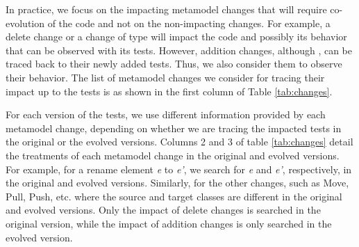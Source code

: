 
\blue{}In practice, we focus on the impacting metamodel changes that will require co-evolution of the code and not on the non-impacting changes. For example, a delete change or a change of type will impact the code and possibly its behavior that can be observed with its tests. 
However, addition changes, although , can be traced back to their newly added tests. Thus, we also consider them to observe their behavior.
The list of metamodel changes \cite{iovino2012impact,cicchetti_managing_2009} we consider for tracing their impact up to the tests is as shown in the first column of Table \ref{tab:changes}. 

For each version of the tests, we use different information provided by each metamodel change, depending on whether we are tracing the impacted tests in the original or the evolved versions. Columns 2 and 3 of table \ref{tab:changes} detail the treatments of each metamodel change in the original and evolved versions. For example, for a rename element \emph{e} to \emph{e'}, we search for \emph{e} and \emph{e'}, respectively, in the original and evolved versions. Similarly, for the other changes, such as Move, Pull, Push, etc. where the source and target classes are different in the original and evolved versions. Only the impact of delete changes is searched in the original version, while the impact of addition changes is only searched in the evolved version. 


